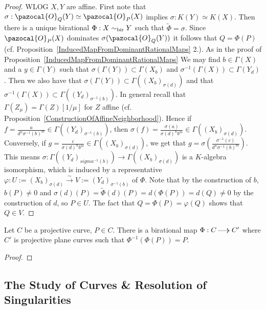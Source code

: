     \begin{proof}
        WLOG $X,Y$ are affine. First note that $\sigma:\pazocal{O}_Q(Y)\simeq \pazocal{O}_P(X)$ implies $\sigma: K(Y)\simeq K(X)$. Then there is a unique birational $\Phi : X\sim_{\mathrm{bir}} Y$ such that $\widetilde{\Phi}=\sigma$. Since $\pazocal{O}_P(X)$ dominates $\sigma(\pazocal{O}_Q(Y))$ it follows that $Q=\Phi(P)$ (cf. Proposition~\ref{InducedMapFromDominantRationalMaps} 2.). As in the proof of Proposition~\ref{InducedMapFromDominantRationalMaps} We may find $b\in \Gamma(X)$ and a $y\in \Gamma(Y)$ such that $\sigma(\Gamma(Y))\subset \Gamma(X_b)$ and $\sigma^{-1}(\Gamma(X))\subset \Gamma(Y_d)$. Then we also have that $\sigma(\Gamma(Y))\subset \Gamma((X_b)_{\sigma(d)})$ and that $\sigma^{-1}(\Gamma(X))\subset \Gamma((Y_d)_{\sigma^{-1}(b)})$. In general recall that $\Gamma(Z_\mu)=\Gamma(Z)[1/\mu]$ for $Z$ affine (cf. Proposition~\ref{ConstructionOfAffineNeighborhood}). Hence if $f=\frac{a}{d^n\sigma^{-1}(b)^m}\in \Gamma((Y_d)_{\sigma^{-1}(b)})$, then $\sigma(f)=\frac{\sigma(a)}{\sigma(d)^nb^m}\in \Gamma((X_b)_{\sigma(d)})$. Conversely, if $g=\frac{c}{\sigma(d)^nb^m}\in \Gamma((X_b)_{\sigma(d)})$, we get that $g=\sigma\left(\frac{\sigma^{-1}(c)}{d^n\sigma^{-1}(b)^m}\right).$ This means $\sigma : \Gamma((Y_d)_{sigma^{-1}(b)})\rightarrow \Gamma((X_b)_{\sigma(d)})$ is a $K$-algebra isomorphism, which is induced by a representative $\varphi: U:=(X_b)_{\sigma(d)}\overset{\sim}{\rightarrow} V:=(Y_d)_{\sigma^{-1}(b)}$ of $\Phi$. Note that by the construction of $b$, $b(P)\neq 0$ and $\sigma(d)(P)= \widetilde{\Phi}(d)(P)=d(\Phi(P))=d(Q)\neq 0$ by the construction of $d$, so $P\in U$. The fact that $Q=\Phi(P)=\varphi(Q)$ shows that $Q\in V$. 
    \end{proof}
    \begin{proposition}
        Let $C$ be a projective curve, $P\in C$. There is a birational map $\Phi: C \dottedarrow C'$ where $C'$ is projective plane curves such that $\Phi^{-1}(\Phi(P))=P$. 
    \end{proposition}
    \begin{proof}
    
    \end{proof}
\subsection{The Study of Curves \& Resolution of Singularities}
